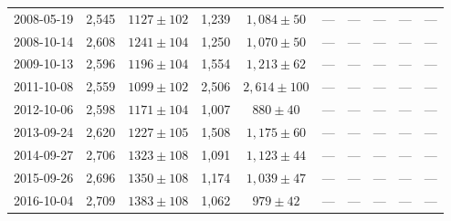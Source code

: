 \begin{landscape}
\begin{longtable}{cccccccccc}
{2008-05-19} & 2,545 & {$1127  \pm  102$} & 1,239 & {$1,084 \pm 50$} & --- & --- & --- & --- & --- \\
{2008-10-14} & 2,608 & {$1241  \pm  104$} & 1,250 & {$1,070 \pm 50$} & --- & --- & --- & --- & --- \\
{2009-10-13} & 2,596 & {$1196  \pm  104$} & 1,554 & {$1,213 \pm 62$} & --- & --- & --- & --- & --- \\
{2011-10-08} & 2,559 & {$1099  \pm  102$} & 2,506 & {$2,614 \pm 100$} & --- & --- & --- & --- & --- \\
{2012-10-06} & 2,598 & {$1171  \pm  104$} & 1,007 & {$880 \pm 40$} & --- & --- & --- & --- & --- \\
{2013-09-24} & 2,620 & {$1227  \pm  105$} & 1,508 & {$1,175 \pm 60$} & --- & --- & --- & --- & --- \\
{2014-09-27} & 2,706 & {$1323  \pm  108$} & 1,091 & {$1,123 \pm 44$} & --- & --- & --- & --- & --- \\
{2015-09-26} & 2,696 & {$1350  \pm  108$} & 1,174 & {$1,039 \pm 47$} & --- & --- & --- & --- & --- \\
{2016-10-04} & 2,709 & {$1383  \pm  108$} & 1,062 & {$979 \pm 42$} & --- & --- & --- & --- & --- \\
\end{longtable} 
\end{landscape} 
